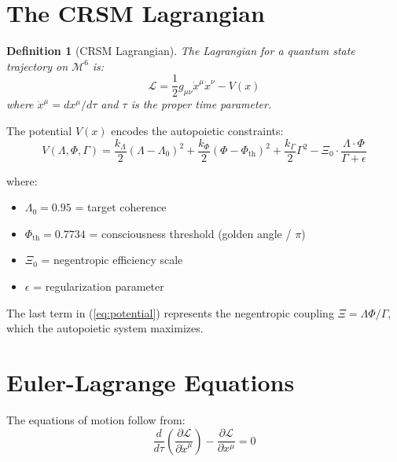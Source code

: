 \documentclass[12pt,letterpaper]{article}
\newtheorem{definition}{Definition}
\begin{document}
\section{The CRSM Lagrangian}

\begin{definition}[CRSM Lagrangian]
The Lagrangian for a quantum state trajectory on $\mathcal{M}^6$ is:
\begin{equation}
\mathcal{L} = \frac{1}{2} g_{\mu\nu} \dot{x}^\mu \dot{x}^\nu - V(x)
\label{eq:lagrangian}
\end{equation}
where $\dot{x}^\mu = dx^\mu/d\tau$ and $\tau$ is the proper time parameter.
\end{definition}

The potential $V(x)$ encodes the autopoietic constraints:
\begin{equation}
V(\Lambda, \Phi, \Gamma) = \frac{k_\Lambda}{2}(\Lambda - \Lambda_0)^2 + \frac{k_\Phi}{2}(\Phi - \Phi_{\text{th}})^2 + \frac{k_\Gamma}{2}\Gamma^2 - \Xi_0 \cdot \frac{\Lambda \cdot \Phi}{\Gamma + \epsilon}
\label{eq:potential}
\end{equation}

where:
\begin{itemize}
    \item $\Lambda_0 = 0.95$ = target coherence
    \item $\Phi_{\text{th}} = 0.7734$ = consciousness threshold (golden angle / $\pi$)
    \item $\Xi_0$ = negentropic efficiency scale
    \item $\epsilon$ = regularization parameter
\end{itemize}

The last term in (\ref{eq:potential}) represents the negentropic coupling $\Xi = \Lambda\Phi/\Gamma$, which the autopoietic system maximizes.

\section{Euler-Lagrange Equations}

The equations of motion follow from:
\begin{equation}
\frac{d}{d\tau}\left(\frac{\partial \mathcal{L}}{\partial \dot{x}^\mu}\right) - \frac{\partial \mathcal{L}}{\partial x^\mu} = 0
\label{eq:euler-lagrange}
\end{equation}
\end{document}
